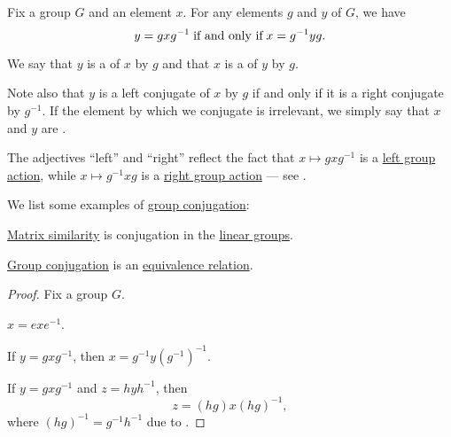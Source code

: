 \begin{definition}\label{def:group_conjugation}
  Fix a group \( G \) and an element \( x \). For any elements \( g \) and \( y \) of \( G \), we have
  \begin{equation}\label{eq:def:group_conjugation}
    y = g x g^{-1} \T{if and only if} x = g^{-1} y g.
  \end{equation}

  We say that \( y \) is a  of \( x \) by \( g \) and that \( x \) is a  of \( y \) by \( g \).

  Note also that \( y \) is a left conjugate of \( x \) by \( g \) if and only if it is a right conjugate by \( g^{-1} \). If the element by which we conjugate is irrelevant, we simply say that \( x \) and \( y \) are .
\end{definition}
\begin{comments}
  \item The adjectives \enquote{left} and \enquote{right} reflect the fact that \( x \mapsto g x g^{-1} \) is a \hyperref[def:group_action]{left group action}, while \( x \mapsto g^{-1} x g \) is a \hyperref[def:group_action]{right group action} --- see .
\end{comments}

\begin{example}\label{ex:def:group_conjugation}
  We list some examples of \hyperref[def:group_conjugation]{group conjugation}:
  \begin{thmenum}
     \hyperref[def:similar_matrices]{Matrix similarity} is conjugation in the \hyperref[def:linear_groups]{linear groups}.
  \end{thmenum}
\end{example}

\begin{proposition}\label{thm:def:group_conjugation}
  \hyperref[def:group_conjugation]{Group conjugation} is an \hyperref[def:equivalence_relation]{equivalence relation}.
\end{proposition}
\begin{proof}
  Fix a group \( G \).

   \( x = e x e^{-1} \).

   If \( y = g x g^{-1} \), then \( x = g^{-1} y (g^{-1})^{-1} \).

   If \( y = g x g^{-1} \) and \( z = h y h^{-1} \), then
  \begin{equation*}
    z = (hg) x (hg)^{-1},
  \end{equation*}
  where \( (hg)^{-1} = g^{-1} h^{-1} \) due to .
\end{proof}

